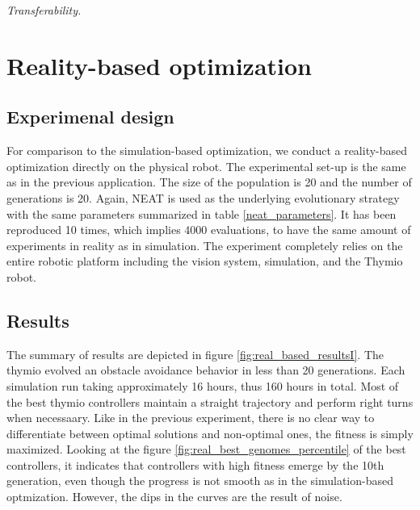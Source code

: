 \emph{Transferability.}

\section{Reality-based optimization}

\subsection{Experimenal design}

For comparison to the simulation-based optimization, we conduct a reality-based optimization directly on the physical robot. The experimental set-up is the same as in the previous application. The size of the population is 20 and the number of generations is 20. Again, NEAT is used as the underlying evolutionary strategy with the same parameters summarized in table \ref{neat_parameters}. It has been reproduced 10 times, which implies 4000 evaluations, to have the same amount of experiments in reality as in simulation. The experiment completely relies on the entire robotic platform including the vision system, simulation, and the Thymio robot.

\subsection{Results}

The summary of results are depicted in figure \ref{fig:real_based_resultsI}. The thymio evolved an obstacle avoidance behavior in less than 20 generations. Each simulation run taking  approximately 16 hours, thus 160 hours in total. Most of the best thymio controllers maintain a straight trajectory and perform right turns when necessaary. Like in the previous experiment, there is no clear way to differentiate between optimal solutions and non-optimal ones, the fitness is simply maximized. Looking at the figure \ref{fig:real_best_genomes_percentile} of the best controllers, it indicates that controllers with high fitness emerge by the 10th generation, even though the progress is not smooth as in the simulation-based optmization. However, the dips in the curves are the result of noise.


